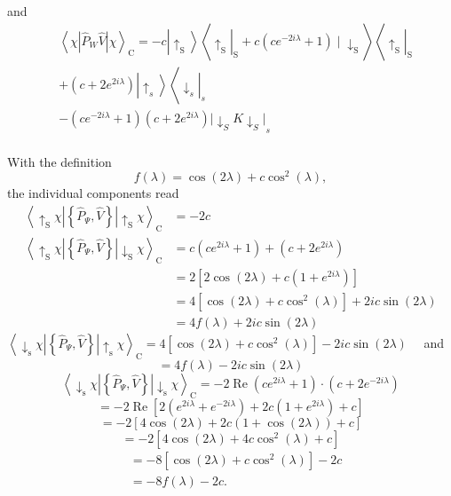 and
$$
\begin{aligned}
& \left\langle\chi\left|\hat{P}_W \hat{V}\right| \chi\right\rangle_{\mathrm{C}}=-c\left|\uparrow_{\mathrm{S}}\right\rangle\left\langle\left.\uparrow_{\mathrm{S}}\right|_{\mathrm{S}}+c\left(c e^{-2 i \lambda}+1\right) \mid \downarrow_{\mathrm{S}}\right\rangle\left\langle\left.\uparrow_{\mathrm{S}}\right|_{\mathrm{S}}\right. \\
& +\left(c+2 e^{2 i \lambda}\right)\left|\uparrow_s\right\rangle\left\langle\left.\downarrow_s\right|_s\right. \\
& -\left(c e^{-2 i \lambda}+1\right)\left(c+2 e^{2 i \lambda}\right)\left|\downarrow_S K \downarrow_S\right|_s \\
&
\end{aligned}
$$

With the definition
$$
f(\lambda)=\cos (2 \lambda)+c \cos ^2(\lambda),
$$
the individual components read
$$
\begin{aligned}
\left\langle\uparrow_{\mathrm{S}} \chi\left|\left\{\hat{P}_{\Psi}, \hat{V}\right\}\right| \uparrow_{\mathrm{S}} \chi\right\rangle_{\mathrm{C}} & =-2 c \\
\left\langle\uparrow_{\mathrm{S}} \chi\left|\left\{\hat{P}_{\Psi}, \hat{V}\right\}\right| \downarrow_{\mathrm{S}} \chi\right\rangle_{\mathrm{C}} & =c\left(c e^{2 i \lambda}+1\right)+\left(c+2 e^{2 i \lambda}\right) \\
& =2\left[2 \cos (2 \lambda)+c\left(1+e^{2 i \lambda}\right)\right] \\
& =4\left[\cos (2 \lambda)+c \cos ^2(\lambda)\right]+2 i c \sin (2 \lambda) \\
& =4 f(\lambda)+2 i c \sin (2 \lambda)
\end{aligned}
$$
$\left\langle\downarrow_{\mathrm{s}} \chi\left|\left\{\hat{P}_{\Psi}, \hat{V}\right\}\right| \uparrow_{\mathrm{s}} \chi\right\rangle_{\mathrm{C}}=4\left[\cos (2 \lambda)+c \cos ^2(\lambda)\right]-2 i c \sin (2 \lambda) \quad$ and
$$
=4 f(\lambda)-2 i c \sin (2 \lambda)
$$
$$
\left\langle\downarrow_{\mathrm{s}} \chi\left|\left\{\hat{P}_{\Psi}, \hat{V}\right\}\right| \downarrow_{\mathrm{s}} \chi\right\rangle_{\mathrm{C}}=-2 \operatorname{Re}\left(c e^{2 i \lambda}+1\right) \cdot\left(c+2 e^{-2 i \lambda}\right)
$$
$$
=-2 \operatorname{Re}\left[2\left(e^{2 i \lambda}+e^{-2 i \lambda}\right)+2 c\left(1+e^{2 i \lambda}\right)+c\right]
$$
$$
=-2[4 \cos (2 \lambda)+2 c(1+\cos (2 \lambda))+c]
$$
$$
=-2\left[4 \cos (2 \lambda)+4 c \cos ^2(\lambda)+c\right]
$$
$$
\begin{aligned}
& =-8\left[\cos (2 \lambda)+c \cos ^2(\lambda)\right]-2 c \\
& =-8 f(\lambda)-2 c .
\end{aligned}
$$

